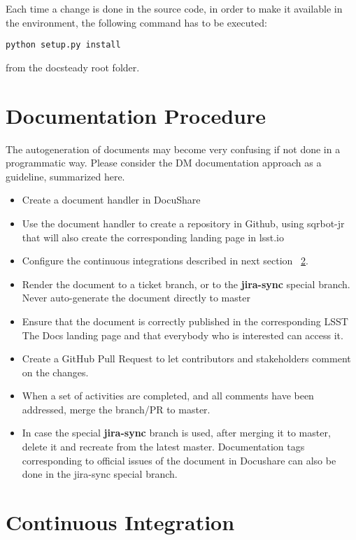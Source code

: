 \documentclass[DM]{lsstdoc}
\begin{document}
Each time a change is done in the source code, in order to make it available in the environment, the following command has to be executed:

\texttt{python setup.py install}

from the docsteady root folder.


\section{Documentation Procedure}
\label{sec:docproc}

The autogeneration of documents may become very confusing if not done in a programmatic way.
Please consider the DM documentation approach as a guideline, summarized here.

\begin{itemize}
\item Create a document handler in DocuShare
\item Use the document handler to create a repository in Github, using sqrbot-jr that will also create the corresponding landing page in lsst.io
\item Configure the continuous integrations described in next section ~\ref{sec:ci}.
\item Render the document to a ticket branch, or to the \textbf{jira-sync} special branch. Never auto-generate the document directly to master
\item Ensure that the document is correctly published in the corresponding LSST The Docs landing page and that everybody who is interested can access it.
\item Create a GitHub Pull Request to let contributors and stakeholders comment on the changes.
\item When a set of activities are completed, and all comments have been addressed, merge the branch/PR to master.
\item In case the special \textbf{jira-sync} branch is used, after merging it to master, delete it  and recreate from the latest master. Documentation tags corresponding to official issues of the document in Docushare can also be done in the jira-sync special branch.
\end{itemize}



\section{Continuous Integration}\label{sec:ci}
\end{document}

